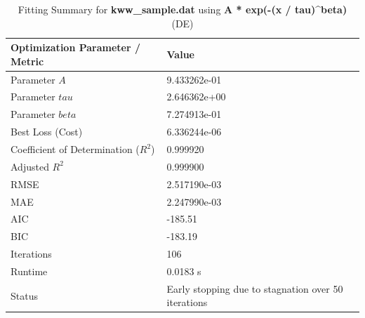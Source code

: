 \begin{table}[htbp]
\centering
\caption{Fitting Summary for \textbf{kww_sample.dat} using \textbf{A * exp(-(x / tau)^beta)} (DE)}
\begin{tabular}{ll}
\hline\hline
\textbf{Optimization Parameter / Metric} & \textbf{Value} \\
\hline
Parameter $A$ & 9.433262e-01 \\
Parameter $tau$ & 2.646362e+00 \\
Parameter $beta$ & 7.274913e-01 \\
\hline
Best Loss (Cost) & 6.336244e-06 \\
Coefficient of Determination ($R^2$) & 0.999920 \\
Adjusted $R^2$ & 0.999900 \\
RMSE & 2.517190e-03 \\
MAE & 2.247990e-03 \\
AIC & -185.51 \\
BIC & -183.19 \\
\hline
Iterations & 106 \\
Runtime & 0.0183 s \\
Status & Early stopping due to stagnation over 50 iterations \\
\hline\hline
\end{tabular}
\label{tab:edibot_fit_kww_sample_dat}
\end{table}
